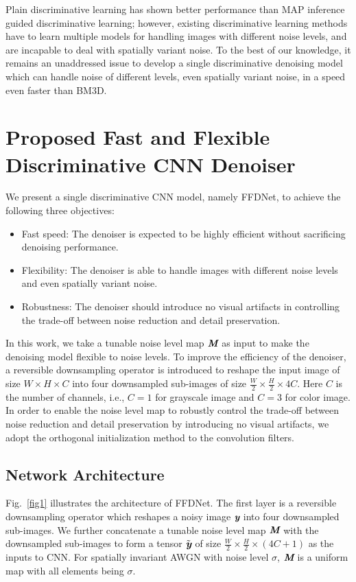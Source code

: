 \documentclass[journal]{IEEEtran}
\begin{document}
Plain discriminative learning has shown better performance than MAP inference guided discriminative learning; however, existing discriminative learning methods have to learn multiple models for handling images with different noise levels, and are incapable to deal with spatially variant noise. To the best of our knowledge, it remains an unaddressed issue to develop a single discriminative denoising model which can handle noise of different levels, even spatially variant noise, in a speed even faster than BM3D.


\section{Proposed Fast and Flexible Discriminative CNN Denoiser}
\label{sec:method}
We present a single discriminative CNN model, namely FFDNet, to achieve the following three objectives:
\begin{itemize}
\item Fast speed: The denoiser is expected to be highly efficient without sacrificing denoising performance.
\item Flexibility: The denoiser is able to handle images with different noise levels and even spatially variant noise.
\item Robustness: The denoiser should introduce no visual artifacts in controlling the trade-off between noise reduction and detail preservation.
\end{itemize}

In this work, we take a tunable noise level map $\emph{\textbf{M}}$ as input to make the denoising model flexible to noise levels. To improve the efficiency of the denoiser, a reversible downsampling operator is introduced to reshape the input image of size $W\times H\times C$ into four downsampled sub-images of size $\frac{W}{2} \times \frac{H}{2} \times 4C$.
Here $C$ is the number of channels, i.e., $C = 1$ for grayscale image and $C = 3$ for color image.
In order to enable the noise level map to robustly control the trade-off between noise
reduction and detail preservation by introducing no visual artifacts, we adopt the orthogonal
initialization method to the convolution filters.



\subsection{Network Architecture}

Fig.~\ref{fig1} illustrates the architecture of FFDNet. The first layer is a reversible downsampling operator which reshapes
a noisy image $\emph{\textbf{y}}$ into four downsampled sub-images.
We further concatenate a tunable noise level map $\emph{\textbf{M}}$ with the downsampled sub-images to form a tensor $\tilde{\emph{\textbf{y}}}$ of size $\frac{W}{2}\times\frac{H}{2}\times (4C + 1)$ as the inputs to CNN.
For spatially invariant AWGN with noise level $\sigma$, $\emph{\textbf{M}}$ is a uniform map with all elements being $\sigma$.
\end{document}

